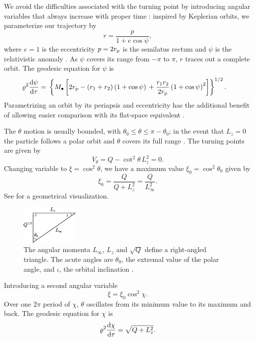 We avoid the difficulties associated with the turning point by introducing angular variables that always increase with proper time \citep{Drasco2004}: inspired by Keplerian orbits, we parameterize our trajectory by
\begin{equation}
r = \frac{p}{1+e\cos\psi},
\end{equation}
where $e = 1$ is the eccentricity $p = 2r_\mathrm{p}$ is the semilatus rectum and $\psi$ is the relativistic anomaly \citep{Darwin1961}. As $\psi$ covers its range from $-\pi$ to $\pi$, $r$ traces out a complete orbit. The geodesic equation for $\psi$ is
\begin{align}
\varrho^2 \diff{\psi}{\tau} = {} & \left\{M_\bullet\left[2r\sub{p} - \left(r_1 + r_2\right)\left(1 + \cos\psi\right) \vphantom{\frac{r_1 r_2}{2r\sub{p}}} +  \frac{r_1 r_2}{2r\sub{p}}\left(1 + \cos\psi\right)^2\right]\right\}^{1/2}.
\end{align}
Parametrizing an orbit by its periapsis and eccentricity has the additional benefit of allowing easier comparison with its flat-space equivalent \citep{Gair2005}.

The $\theta$ motion is usually bounded, with $\theta_0 \leq \theta \leq \pi - \theta_0$; in the event that $L_z = 0$ the particle follows a polar orbit and $\theta$ covers its full range \citep{Wilkins1972}. The turning points are given by
\begin{equation}
V_\theta = Q - \cot^2\theta\, L_z^2 = 0.
\end{equation}
Changing variable to $\xi = \cos^2\theta$, we have a maximum value $\xi_0 = \cos^2\theta_0$ given by
\begin{equation}
\xi_0 = \frac{Q}{Q+L_z^2} = \frac{Q}{L_\infty^2}.
\label{eq:theta_0}
\end{equation}
See  for a geometrical visualization.
\begin{figure}
\centering
\includegraphics[width=0.25\textwidth]{./images/Triangle}
    \caption{The angular momenta $L_\infty$, $L_z$ and $\sqrt{Q}$ define a right-angled triangle. The acute angles are $\theta_0$, the extremal value of the polar angle, and $\iota$, the orbital inclination \citep{Ryan1996,Glampedakis2002}.}
    \label{fig:L_triangle}
\end{figure}
Introducing a second angular variable \citep{Hughes2000,Drasco2004}
\begin{equation}
\xi = \xi_0\cos^2\chi.
\end{equation}
Over one $2\pi$ period of $\chi$, $\theta$ oscillates from its minimum value to its maximum and back. The geodesic equation for $\chi$ is
\begin{equation}
\varrho^2\frac{\mathrm{d} {\chi}}{\mathrm{d} {\tau}} = \sqrt{Q + L_z^2}.
\end{equation}

